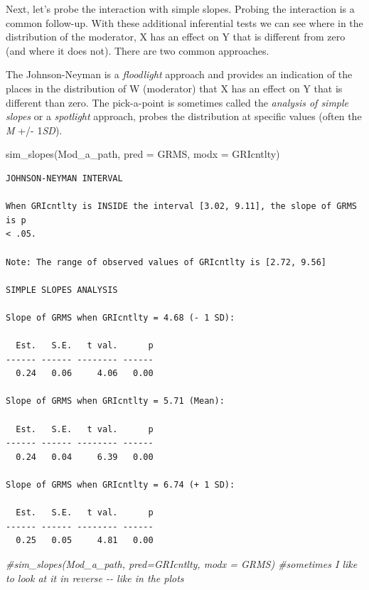 \documentclass[
  11pt,
]{book}
\newenvironment{Shaded}{\begin{snugshade}}{\end{snugshade}}
\newcommand{\AttributeTok}[1]{\textcolor[rgb]{0.77,0.63,0.00}{#1}}
\newcommand{\CommentTok}[1]{\textcolor[rgb]{0.56,0.35,0.01}{\textit{#1}}}
\newcommand{\FunctionTok}[1]{\textcolor[rgb]{0.00,0.00,0.00}{#1}}
\newcommand{\NormalTok}[1]{#1}
\begin{document}
Next, let's probe the interaction with simple slopes. Probing the interaction is a common follow-up. With these additional inferential tests we can see where in the distribution of the moderator, X has an effect on Y that is different from zero (and where it does not). There are two common approaches.

The Johnson-Neyman is a \emph{floodlight} approach and provides an indication of the places in the distribution of W (moderator) that X has an effect on Y that is different than zero. The pick-a-point is sometimes called the \emph{analysis of simple slopes} or a \emph{spotlight} approach, probes the distribution at specific values (often the \emph{M} +/- 1\emph{SD}).

\begin{Shaded}
\begin{Highlighting}[]
\FunctionTok{sim\_slopes}\NormalTok{(Mod\_a\_path, }\AttributeTok{pred =}\NormalTok{ GRMS, }\AttributeTok{modx =}\NormalTok{ GRIcntlty)}
\end{Highlighting}
\end{Shaded}

\begin{verbatim}
JOHNSON-NEYMAN INTERVAL 

When GRIcntlty is INSIDE the interval [3.02, 9.11], the slope of GRMS is p
< .05.

Note: The range of observed values of GRIcntlty is [2.72, 9.56]

SIMPLE SLOPES ANALYSIS 

Slope of GRMS when GRIcntlty = 4.68 (- 1 SD): 

  Est.   S.E.   t val.      p
------ ------ -------- ------
  0.24   0.06     4.06   0.00

Slope of GRMS when GRIcntlty = 5.71 (Mean): 

  Est.   S.E.   t val.      p
------ ------ -------- ------
  0.24   0.04     6.39   0.00

Slope of GRMS when GRIcntlty = 6.74 (+ 1 SD): 

  Est.   S.E.   t val.      p
------ ------ -------- ------
  0.25   0.05     4.81   0.00
\end{verbatim}

\begin{Shaded}
\begin{Highlighting}[]
\CommentTok{\#sim\_slopes(Mod\_a\_path, pred=GRIcntlty, modx = GRMS) \#sometimes I like to look at it in reverse {-}{-} like in the plots}
\end{Highlighting}
\end{Shaded}
\end{document}
